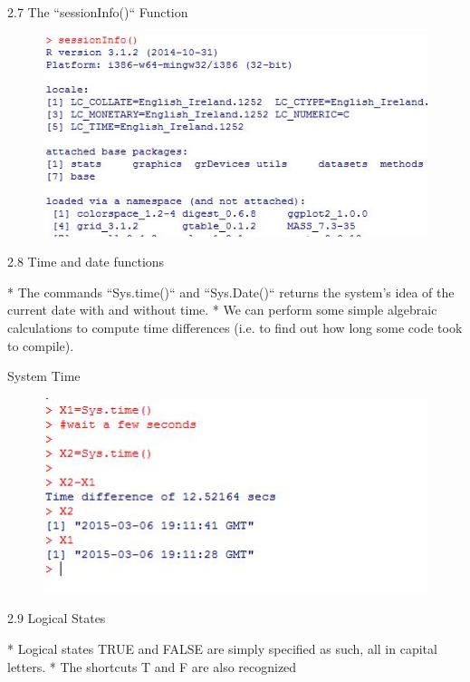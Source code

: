 \documentclass{beamer}
\begin{document}
{2.7 The ``sessionInfo()`` Function}
\begin{figure}
\centering
\includegraphics[width=0.99\linewidth]{images/sessionInfo}
\end{figure}


{2.8 Time and date functions}

* The commands ``Sys.time()`` and ``Sys.Date()`` returns the system’s idea of the current date
with and without time. 
* We can perform some simple algebraic calculations to compute time
differences (i.e. to find out how long some code took to compile).




{System Time}
\begin{figure}
\centering
\includegraphics[width=1.2\linewidth]{images/Systime}
\end{figure}


 
{2.9 Logical States}

* Logical states TRUE and FALSE are simply specified as such, all in capital letters. 
* The
shortcuts T and F are also recognized
\end{document}
